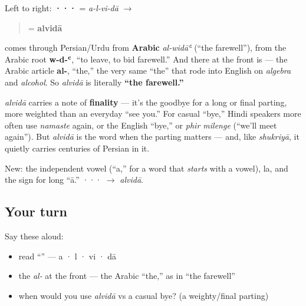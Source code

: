 Left to right: \textbf{···} = \emph{a-l-vi-dā} $\to$

\begin{quote}
\textbf{} = \textbf{alvidā}
\end{quote}

\begin{cousinweb}
\textbf{} comes through Persian/Urdu from \textbf{Arabic} \emph{al-widāʿ} (\textquotedblleft{}the farewell\textquotedblright{}), from the Arabic root \textbf{w-d-ʿ}, \textquotedblleft{}to leave, to bid farewell.\textquotedblright{} And there at the front is \textbf{} — the Arabic article \textbf{al-}, \textquotedblleft{}the,\textquotedblright{} the very same \textquotedblleft{}the\textquotedblright{} that rode into English on \emph{algebra} and \emph{alcohol}. So \emph{alvidā} is literally \textbf{\textquotedblleft{}the farewell.\textquotedblright{}}
\end{cousinweb}

\begin{culture}
\emph{alvidā} carries a note of \textbf{finality} — it's the goodbye for a long or final parting, more weighted than an everyday \textquotedblleft{}see you.\textquotedblright{} For casual \textquotedblleft{}bye,\textquotedblright{} Hindi speakers more often use \emph{namaste} again, or the English \textquotedblleft{}bye,\textquotedblright{} or \emph{phir milenge} (\textquotedblleft{}we'll meet again\textquotedblright{}). But \emph{alvidā} is the word when the parting matters — and, like \emph{shukriyā}, it quietly carries centuries of Persian in it.
\end{culture}

\begin{sounds}
New: the independent vowel  (“a,” for a word that \emph{starts} with a vowel),  la, and the sign  for long “ā.” ··· $\to$ \emph{alvidā}.
\end{sounds}

\subsection*{Your turn}
Say these aloud:

\begin{itemize}
\raggedright
  \item read \textquotedblleft{}\textquotedblright{} — a · l · vi · dā
  \item the \emph{al-} at the front — the Arabic \textquotedblleft{}the,\textquotedblright{} as in \textquotedblleft{}the farewell\textquotedblright{}
  \item when would you use \emph{alvidā} vs a casual bye? (a weighty/final parting)
\end{itemize}

